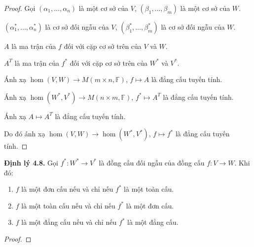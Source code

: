 \documentclass[class=linearalgebra,crop=false]{standalone}
\begin{document}
\begin{proof}
    \par Gọi $(\alpha_{1}, \ldots, \alpha_{n})$ là một cơ sở của $V$, $(\beta_{1}, \ldots, \beta_{m})$ là một cơ sở của $W$.
    \par $(\alpha^{*}_{1}, \ldots, \alpha^{*}_{n})$ là cơ sở đối ngẫu của $V$, $(\beta^{*}_{1}, \ldots, \beta^{*}_{m})$ là cơ sở đối ngẫu của $W$.
    \par $A$ là ma trận của $f$ đối với cặp cơ sở trên của $V$ và $W$.
    \par $A^{T}$ là ma trận của $f^{*}$ đối với cặp cơ sở trên của $W^{*}$ và $V^{*}$.
    \par Ánh xạ $\hom(V,W)\to M(m\times n,\mathbb{F})$, $f\mapsto A$ là đẳng cấu tuyến tính.
    \par Ánh xạ $\hom(W^{*},V^{*})\to M(n\times m,\mathbb{F})$, $f^{*}\mapsto A^{T}$ là đẳng cấu tuyến tính.
    \par Ánh xạ $A\mapsto A^{T}$ là đẳng cấu tuyến tính.
    \par Do đó ánh xạ $\hom(V,W)\to\hom(W^{*},V^{*})$, $f\mapsto f^{*}$ là đẳng cấu tuyến tính.
\end{proof}

\noindent\textbf{Định lý 4.8.} Gọi $f^{*}: W^{*}\to V^{*}$ là đồng cấu đối ngẫu của đồng cấu $f: V\to W$. Khi đó:
\begin{enumerate}[label = (\arabic*)]
    \item $f$ là một đơn cấu nếu và chỉ nếu $f^{*}$ là một toàn cấu.
    \item $f$ là một toàn cấu nếu và chỉ nếu $f^{*}$ là một đơn cấu.
    \item $f$ là một đẳng cấu nếu và chỉ nếu $f^{*}$ là một đẳng cấu.
\end{enumerate}

\begin{proof}
\end{proof}
\end{document}
